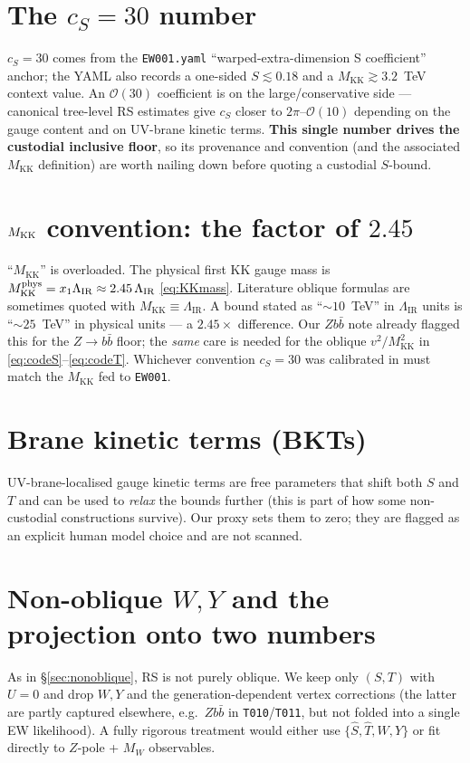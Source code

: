 \documentclass[11pt]{article}
\newcommand{\MKK}{M_{\mathrm{KK}}}
\newcommand{\LIR}{\Lambda_{\mathrm{IR}}}
\newcommand{\vev}{v}
\newcommand{\code}[1]{\texttt{#1}}
\theoremstyle{definition}
\begin{document}
\section{The $c_S=30$ number}
$c_S=30$ comes from the \code{EW001.yaml} ``warped-extra-dimension S
coefficient'' anchor; the YAML also records a one-sided $S\lesssim 0.18$ and a
$\MKK \gtrsim 3.2$~TeV context value. An $\mathcal{O}(30)$ coefficient is on the
large/conservative side --- canonical tree-level RS estimates give $c_S$ closer
to $2\pi$--$\mathcal{O}(10)$ depending on the gauge content and on UV-brane
kinetic terms. \textbf{This single number drives the custodial inclusive floor},
so its provenance and convention (and the associated $\MKK$ definition) are worth
nailing down before quoting a custodial $S$-bound.

\section{$M_{\rm KK}$ convention: the factor of $2.45$}
\label{sec:Mconvention}
``$\MKK$'' is overloaded. The physical first KK gauge mass is
$\MKK^{\rm phys} = x_1\LIR \approx 2.45\,\LIR$ \eqref{eq:KKmass}. Literature
oblique formulas are sometimes quoted with $\MKK \equiv \LIR$. A bound stated as
``$\sim 10$~TeV'' in $\LIR$ units is ``$\sim 25$~TeV'' in physical units --- a
$2.45\times$ difference. Our $Zb\bar b$ note already flagged this for the
$Z\to b\bar b$ floor; the \emph{same} care is needed for the oblique
$\vev^2/\MKK^2$ in \eqref{eq:codeS}--\eqref{eq:codeT}. Whichever convention
$c_S=30$ was calibrated in must match the $\MKK$ fed to \code{EW001}.

\section{Brane kinetic terms (BKTs)}
UV-brane-localised gauge kinetic terms are free parameters that shift both $S$
and $T$ and can be used to \emph{relax} the bounds further (this is part of how
some non-custodial constructions survive). Our proxy sets them to zero; they are
flagged as an explicit human model choice and are not scanned.

\section{Non-oblique $W,Y$ and the projection onto two numbers}
As in \S\ref{sec:nonoblique}, RS is not purely oblique. We keep only $(S,T)$ with
$U=0$ and drop $W,Y$ and the generation-dependent vertex corrections (the latter
are partly captured elsewhere, e.g.\ $Zb\bar b$ in \code{T010}/\code{T011}, but
not folded into a single EW likelihood). A fully rigorous treatment would either
use $\{\hat S,\hat T,W,Y\}$ or fit directly to $Z$-pole + $M_W$ observables.
\end{document}
